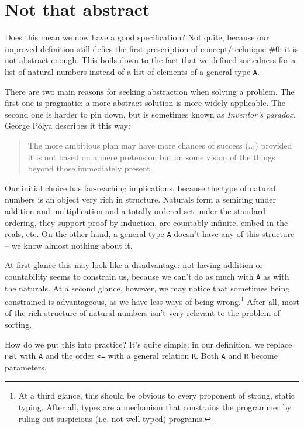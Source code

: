 \documentclass[declaration,mgr,english,shortabstract]{iithesis}
\newcommand{\m}[1]{\texttt{#1}}
\begin{document}
\section{Not that abstract} \label{notabstract}

Does this mean we now have a good specification? Not quite, because our improved definition still defies the first prescription of concept/technique \#0: it is not abstract enough. This boils down to the fact that we defined sortedness for a list of natural numbers instead of a list of elements of a general type \m{A}.

There are two main reasons for seeking abstraction when solving a problem. The first one is pragmatic: a more abstract solution is more widely applicable. The second one is harder to pin down, but is sometimes known as \textit{Inventor's paradox}. George Pólya describes it this way:

\begin{quote}
    The more ambitious plan may have more chances of success (...) provided it is not based on a mere pretension but on some vision of the things beyond those immediately present.\cite{Polya}
\end{quote}

Our initial choice has far-reaching implications, because the type of natural numbers is an object very rich in structure. Naturals form a semiring under addition and multiplication and a totally ordered set under the standard ordering, they support proof by induction, are countably infinite, embed in the reals, etc. On the other hand, a general type \m{A} doesn't have any of this structure -- we know almost nothing about it.

At first glance this may look like a disadvantage: not having addition or countability seems to constrain us, because we can't do as much with \m{A} as with the naturals. At a second glance, however, we may notice that sometimes being constrained is advantageous, as we have less ways of being wrong.\footnote{At a third glance, this should be obvious to every proponent of strong, static typing. After all, types are a mechanism that constrains the programmer by ruling out suspicious (i.e. not well-typed) programs.} After all, most of the rich structure of natural numbers isn't very relevant to the problem of sorting.

How do we put this into practice? It's quite simple: in our definition, we replace \m{nat} with \m{A} and the order \m{<=} with a general relation \m{R}. Both \m{A} and \m{R} become parameters.
\end{document}
